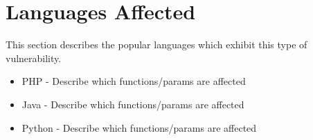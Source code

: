 \section{Languages Affected}

This section describes the popular languages which exhibit this type of vulnerability. 
\begin{itemize}
	\item PHP - Describe which functions/params are affected
	\item Java - Describe which functions/params are affected
	\item Python - Describe which functions/params are affected
\end{itemize}
 

